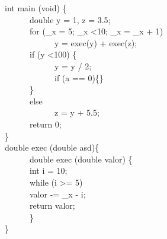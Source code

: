 \documentclass[tikz,border=10pt]{standalone}
\begin{document}
int main (void) \{\\

\ \ \ \ \ \    double y = 1, z = 3.5;\\

\ \ \ \ \ \    for (\_x = 5; \_x \textless 10; \_x = \_x + 1)\\

\ \ \ \ \ \    \ \ \ \ \ \    y = exec(y) + exec(z);\\

\ \ \ \ \ \    if (y \textless 100) \{\\

\ \ \ \ \ \    \ \ \ \ \ \    y = y / 2;\\

\ \ \ \ \ \      \ \ \ \ \ \  if (a == 0)\{\}\\

\ \ \ \ \ \   \}\\

 \ \ \ \ \ \   else\\

 \ \ \ \ \ \  \ \ \ \ \ \     z = y + 5.5;\\

\ \ \ \ \ \    return 0;\\

\} \\

double exec (double asd)\{\\

\ \ \ \ \ \ double exec (double valor) \{\\

 \ \ \ \ \ \    int i = 10;\\

\ \ \ \ \ \     while (i \textgreater = 5)\\

\ \ \ \ \ \         valor -= \_x - i;\\

\ \ \ \ \ \     return valor;\\

\ \ \ \ \ \  \}\\

\}\\
\end{document}
